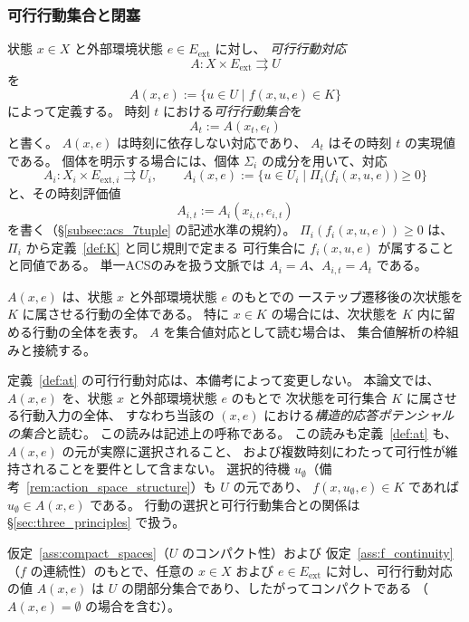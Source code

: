 \subsubsection{可行行動集合と閉塞}

\begin{definition}[可行行動対応と可行行動集合]
\label{def:at}
状態 $x\in X$ と外部環境状態 $e\in E_{\mathrm{ext}}$ に対し、
\emph{可行行動対応}
\[
  A:X\times E_{\mathrm{ext}}\rightrightarrows U
\]
を
\[
  A(x,e) := \{u\in U \mid f(x, u, e)\in K\}
\]
によって定義する。
時刻 $t$ における\emph{可行行動集合}を
\[
  A_t := A(x_t,e_t)
\]
と書く。
$A(x,e)$ は時刻に依存しない対応であり、
$A_t$ はその時刻 $t$ の実現値である。
個体を明示する場合には、個体 $\Sigma_i$ の成分を用いて、対応
\[
  A_i:X_i\times E_{\mathrm{ext},i}\rightrightarrows U_i,
  \qquad
  A_i(x,e):=\{u\in U_i\mid \Pi_i\bigl(f_i(x,u,e)\bigr)\geq0\}
\]
と、その時刻評価値
\[
  A_{i,t}:=A_i(x_{i,t},e_{i,t})
\]
を書く（\S\ref{subsec:acs_7tuple} の記述水準の規約）。
$\Pi_i(f_i(x,u,e))\geq0$ は、$\Pi_i$ から定義~\ref{def:K} と同じ規則で定まる
可行集合に $f_i(x,u,e)$ が属することと同値である。
単一ACSのみを扱う文脈では $A_i=A$、$A_{i,t}=A_t$ である。

$A(x,e)$ は、状態 $x$ と外部環境状態 $e$ のもとでの
一ステップ遷移後の次状態を $K$ に属させる行動の全体である。
特に $x\in K$ の場合には、次状態を $K$ 内に留める行動の全体を表す。
$A$ を集合値対応として読む場合は、
集合値解析の枠組みと接続する\cite{AubinFrankowska1990}。
\end{definition}

\begin{remark}[可行行動集合の読み]
\label{rem:at_reading}
定義~\ref{def:at} の可行行動対応は、本備考によって変更しない。
本論文では、$A(x,e)$ を、状態 $x$ と外部環境状態 $e$ のもとで
次状態を可行集合 $K$ に属させる行動入力の全体、
すなわち当該の $(x,e)$ における\emph{構造的応答ポテンシャルの集合}と読む。
この読みは記述上の呼称である。
この読みも定義~\ref{def:at} も、
$A(x,e)$ の元が実際に選択されること、
および複数時刻にわたって可行性が維持されることを要件として含まない。
選択的待機 $u_{\emptyset}$（備考~\ref{rem:action_space_structure}）も $U$ の元であり、
$f(x,u_{\emptyset},e)\in K$ であれば $u_{\emptyset}\in A(x,e)$ である。
行動の選択と可行行動集合との関係は \S\ref{sec:three_principles} で扱う。
\end{remark}

\begin{proposition}[可行行動集合の閉性とコンパクト性]
\label{prop:At_compact}
仮定~\ref{ass:compact_spaces}（$U$ のコンパクト性）および
仮定~\ref{ass:f_continuity}（$f$ の連続性）のもとで、任意の
$x\in X$ および $e\in E_{\mathrm{ext}}$ に対し、可行行動対応の値
$A(x,e)$ は $U$ の閉部分集合であり、したがってコンパクトである
（$A(x,e)=\emptyset$ の場合を含む）。
\end{proposition}

